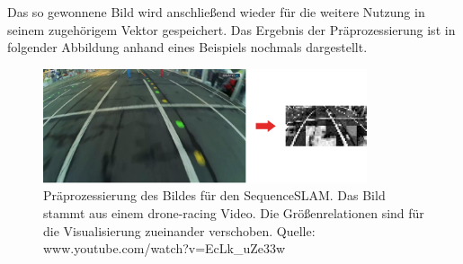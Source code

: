\documentclass[12pt,a4paper,titlepage]{scrartcl}
\begin{document}
Das so gewonnene Bild wird anschließend wieder für die weitere Nutzung in seinem zugehörigem Vektor gespeichert. Das Ergebnis der Präprozessierung ist in folgender Abbildung anhand eines Beispiels nochmals dargestellt.
\begin{figure}[h.t]
	\centering
	\includegraphics[width=0.85\textwidth]{../Bilder/Preprocessing_result.pdf}
	\caption[Präprozessierung des Bildes]{Präprozessierung des Bildes für den SequenceSLAM. Das Bild stammt aus einem drone-racing Video. Die Größenrelationen sind für die Visualisierung zueinander verschoben. Quelle: www.youtube.com/watch?v=EcLk\_uZe33w }
	\label{img:Prepro}
\end{figure}
\newpage
\end{document}
